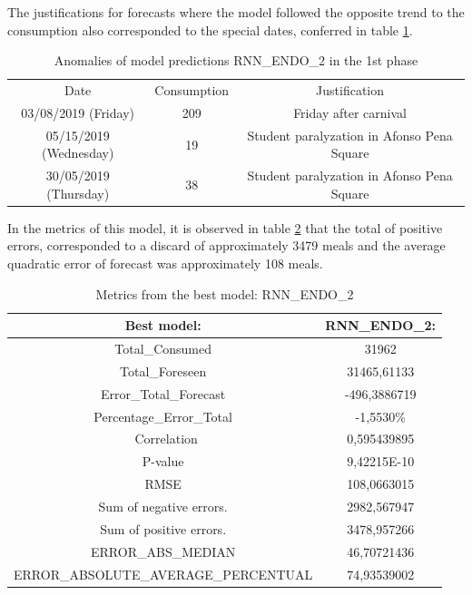         The justifications for forecasts where the model followed the opposite trend to the consumption also corresponded to the special dates, conferred in table \ref{table:rnn_endo_2_red}.
            \begin{table}[!ht]
                \caption{Anomalies of model predictions RNN\_ENDO\_2  in the 1st phase}
                \label{table:rnn_endo_2_red}
                 \begin{tabular}{c|c|c}
                 \rowcolor{gray!50}
                 \hline
                Date & Consumption & Justification \\
                03/08/2019 (Friday)   & 209 &Friday after carnival\\
                05/15/2019 (Wednesday)   & 19  & Student paralyzation in Afonso Pena Square\\
                30/05/2019 (Thursday)   &  38  & Student paralyzation in Afonso Pena Square\\
                \hline 
                \end{tabular} 
            \end{table}
        
        In the metrics of this model, it is observed in table \ref{table:rnn_endo_2_test} that the total of positive errors, corresponded to a discard of approximately 3479 meals and the average quadratic error of forecast was approximately 108 meals.
            \begin{table}[!ht]
                \centering
                \caption{Metrics from the best model:  RNN\_ENDO\_2 }
                \label{table:rnn_endo_2_test}
                \begin{tabular}{c|c}
                \rowcolor{gray!50}
                \hline
                Best model: &   RNN\_ENDO\_2: \\ \hline
                Total\_Consumed & 31962 \\ 
                Total\_Foreseen & 31465,61133 \\
                Error\_Total\_Forecast & -496,3886719 \\
                Percentage\_Error\_Total & -1,5530\% \\\
               Correlation & 0,595439895 \\
                P-value & 9,42215E-10    \\
                RMSE &  108,0663015\\
                Sum of negative errors. & 2982,567947 \\
                Sum of positive errors. & 3478,957266\\
                ERROR\_ABS\_MEDIAN & 46,70721436 \\ 
                ERROR\_ABSOLUTE\_AVERAGE\_PERCENTUAL & 74,93539002 \\ 
                \hline
                \end{tabular}
            \end{table}
        

